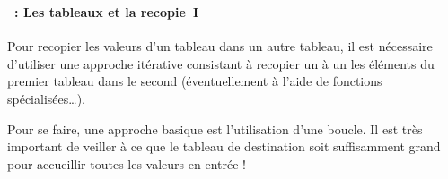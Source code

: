 \begin{frame}
  \frametitle{\secname}
  \framesubtitle{\subsecname~: Les tableaux et la recopie~I}

  Pour recopier les valeurs d'un tableau dans un autre tableau, il est nécessaire d'utiliser une approche itérative consistant à recopier
  un à un les éléments du premier tableau dans le second (éventuellement à l'aide de fonctions spécialisées\ldots).
  \vspace{0.5cm}
  \par
  Pour se faire, une approche basique est l'utilisation d'une boucle. Il est très important de veiller à ce que le tableau de destination 
  soit suffisamment grand pour accueillir toutes les valeurs en entrée !
\end{frame}

